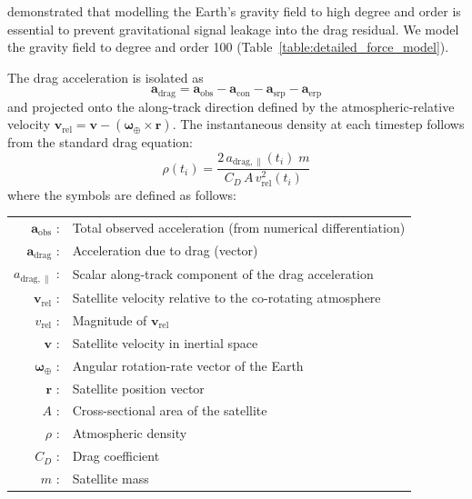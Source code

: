 \documentclass{agujournal2019}
\begin{document}
demonstrated that modelling the Earth's gravity field to high degree and order
is essential to prevent gravitational signal leakage into the drag residual.
We model the gravity field to degree and order 100
(Table~\ref{table:detailed_force_model}).

The drag acceleration is isolated as
\begin{equation}
\label{drag_eqn}
\mathbf{a}_{\text{drag}}
= \mathbf{a}_{\text{obs}}
- \mathbf{a}_{\text{con}}
- \mathbf{a}_{\text{srp}}
- \mathbf{a}_{\text{erp}}
\end{equation}
and projected onto the along-track direction defined by the
atmospheric-relative velocity
$\mathbf{v}_{\text{rel}} = \mathbf{v} -
(\boldsymbol{\omega}_{\oplus} \times \mathbf{r})$.
The instantaneous density at each timestep follows from the standard drag
equation:
\begin{equation}
\label{rho_eqn}
\rho(t_i) = \frac{2\,a_{\text{drag},\parallel}(t_i)\; m}
                  {C_D \, A \, v_{\text{rel}}^2(t_i)}
\end{equation}
where the symbols are defined as follows:

\begin{tabular}{r l}
$\mathbf{a}_{\text{obs}}$              : & Total observed acceleration (from numerical differentiation) \\
$\mathbf{a}_{\text{drag}}$            : & Acceleration due to drag (vector) \\
$a_{\text{drag},\parallel}$           : & Scalar along-track component of the drag acceleration \\
$\mathbf{v}_{\text{rel}}$             : & Satellite velocity relative to the co-rotating atmosphere \\
$v_{\text{rel}}$                       : & Magnitude of $\mathbf{v}_{\text{rel}}$ \\
$\mathbf{v}$                          : & Satellite velocity in inertial space \\
$\boldsymbol{\omega}_{\oplus}$        : & Angular rotation-rate vector of the Earth \\
$\mathbf{r}$                          : & Satellite position vector \\
$A$                                    : & Cross-sectional area of the satellite \\
$\rho$                                 : & Atmospheric density \\
$C_{D}$                                : & Drag coefficient \\
$m$                                    : & Satellite mass \\
\end{tabular}
\end{document}
